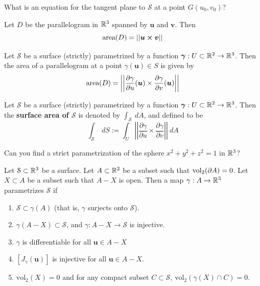     \begin{motivating}
        What is an equation for the tangent plane to $\mathcal{S}$ at a point $G(u_0,v_0)$?
    \end{motivating}
    
\begin{theorem}
    Let $D$ be the parallelogram in $\mathbb{R}^3$ spanned by $\bm{u}$ and $\bm{v}$. Then
    $$\textnormal{area}(D) = ||\bm{u \times v}||$$
    \end{theorem}

\begin{theorem}
    Let $\mathcal{S}$ be a surface (strictly) parametrized by a function $\bm{\gamma} :  U \subset \mathbb{R}^{2} \to \mathbb{R}^3$.  Then the area of a parallelogram at a point $\gamma(\bm{u}) \in S$ is given by $$\textnormal{area}(D) = \left|\left|\frac{\partial \gamma}{\partial u}(\bm{u}) \times \frac{\partial \gamma}{\partial v}(\bm{u})\right|\right|$$ 
    \end{theorem}

\begin{definition}
    Let $\mathcal{S}$ be a surface (strictly) parametrized by a function $\bm{\gamma} :  U \subset \mathbb{R}^{2} \to \mathbb{R}^3$.  Then the \textbf{surface area of $\mathcal{S}$} is denoted by $\int_\mathcal{S} \ dA$, and defined to be
    $$\int_\mathcal{S} \ dS := \int_U \left|\left|\frac{\partial \gamma}{\partial u} \times \frac{\partial \gamma}{\partial v}\right|\right| \ dA$$
    \end{definition}

\begin{motivating}
    Can you find a strict parametrization of the sphere $x^2+y^2+z^2=1$ in $\mathbb{R}^3$?
\end{motivating}

\begin{definition}[Parametrization]
    Let $\mathcal{S} \subset \mathbb{R}^3$ be a surface.  Let $A \subset \mathbb{R}^2$ be a subset such that $\textnormal{vol}_2(\partial A) = 0$.  Let $X \subset A$ be a subset such that $A - X$ is open.  Then a map $\gamma : A \to \mathbb{R}^3$ parametrizes $\mathcal{S}$ if 
    
    \begin{enumerate}
        \item $\mathcal{S} \subset \gamma(A)$ (that is, $\gamma$ surjects onto $\mathcal{S}$).
        \item $\gamma(A - X) \subset \mathcal{S}$, and $\gamma : A - X \to \mathcal{S}$ is injective. 

        \item $\gamma$ is differentiable for all $\bm{u} \in A-X$   
        \item $[J_\gamma(\bm{u})]$ is injective for all $\bm{u} \in A - X$. 
        
        \item $\text{vol}_2(X) = 0$ and for any compact subset $C \subset \mathcal{S}$, $\text{vol}_2(\gamma(X) \cap C) = 0$.
    \end{enumerate}
    
    \end{definition}

